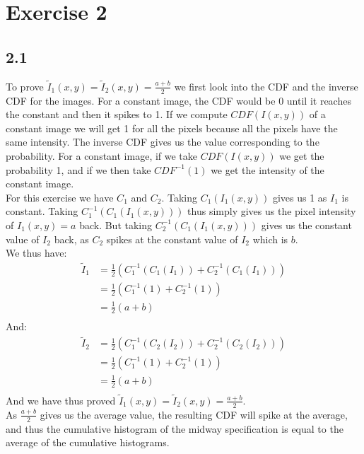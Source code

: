 \section{Exercise 2}
\subsection*{2.1}
To prove $\tilde{I}_1(x,y)  = \tilde{I}_2(x,y) = \frac{a+b}{2}$ we first look into the CDF and the inverse CDF for the images. For a constant image, the CDF would be 0 until it reaches the constant and then it spikes to 1. If we compute $CDF(I(x,y))$ of a constant image we will get 1 for all the pixels because all the pixels have the same intensity. The inverse CDF  gives us the value corresponding to the probability. For a constant image, if we take $CDF(I(x,y))$ we get the probability 1, and if we then take $CDF^{-1}(1)$ we get the intensity of the constant image.\\
For this exercise we have $C_1$ and $C_2$. Taking $C_1(I_1(x,y))$ gives us 1 as $I_1$ is constant. Taking $C_1^{-1}(C_1(I_1(x,y)))$ thus simply gives us the pixel intensity of $I_1(x,y) = a$ back. But taking $C_2^{-1}(C_1(I_1(x,y)))$ gives us the constant value of $I_2$ back, as $C_2$ spikes at the constant value of $I_2$ which is $b$.\\
We thus have:
\begin{align*}
	\tilde{I}_1 &= \frac{1}{2}\left(C_1^{-1}(C_1(I_1)) + C_2^{-1}(C_1(I_1))\right)\\
	&= \frac{1}{2}\left(C_1^{-1}(1) + C_2^{-1}(1)\right)\\
	&= \frac{1}{2}\left(a + b\right)\\
\end{align*}
And:
\begin{align*}
	\tilde{I}_2 &= \frac{1}{2}\left(C_1^{-1}(C_2(I_2)) + C_2^{-1}(C_2(I_2))\right)\\
	&= \frac{1}{2}\left(C_1^{-1}(1) + C_2^{-1}(1)\right)\\
	&= \frac{1}{2}\left(a + b\right)\\
\end{align*}
And we have thus proved $\tilde{I}_1(x,y)  = \tilde{I}_2(x,y) = \frac{a+b}{2}$.\\
As $\frac{a+b}{2}$ gives us the average value, the resulting CDF will spike at the average, and thus the cumulative histogram of the midway specification is equal to the average of the cumulative histograms.

